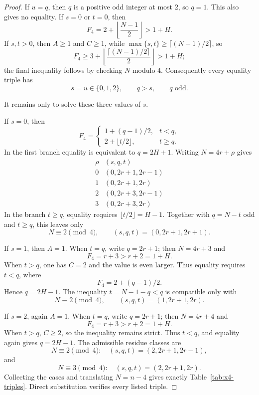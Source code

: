 \documentclass[11pt]{article}
\theoremstyle{definition}
\begin{document}
\begin{proof}
If $u=q$, then $q$ is a positive odd integer at most $2$, so $q=1$. This also gives no equality. If $s=0$ or $t=0$, then
\[
 F_4=2+\left\lfloor\frac{N-1}{2}\right\rfloor>1+H.
\]
If $s,t>0$, then $A\ge1$ and $C\ge1$, while $\max\{s,t\}\ge\lceil(N-1)/2\rceil$, so
\[
 F_4\ge3+\left\lfloor\frac{\lceil(N-1)/2\rceil}{2}\right\rfloor>1+H;
\]
the final inequality follows by checking $N$ modulo $4$. Consequently every equality triple has
\[
 s=u\in\{0,1,2\},\qquad q>s,\qquad q\text{ odd}.
\]

It remains only to solve these three values of $s$.

If $s=0$, then
\[
 F_4=
 \begin{cases}
 1+(q-1)/2,&t<q,\\
 2+\lfloor t/2\rfloor,&t\ge q.
 \end{cases}
\]
In the first branch equality is equivalent to $q=2H+1$. Writing $N=4r+\rho$ gives
\[
\begin{array}{c|c}
\rho&(s,q,t)\\ \hline
0&(0,2r+1,2r-1)\\
1&(0,2r+1,2r)\\
2&(0,2r+3,2r-1)\\
3&(0,2r+3,2r)
\end{array}
\]
In the branch $t\ge q$, equality requires $\lfloor t/2\rfloor=H-1$. Together with $q=N-t$ odd and $t\ge q$, this leaves only
\[
 N\equiv2\pmod4,\qquad (s,q,t)=(0,2r+1,2r+1).
\]

If $s=1$, then $A=1$. When $t=q$, write $q=2r+1$; then $N=4r+3$ and
\[
 F_4=r+3>r+2=1+H.
\]
When $t>q$, one has $C=2$ and the value is even larger. Thus equality requires $t<q$, where
\[
 F_4=2+(q-1)/2.
\]
Hence $q=2H-1$. The inequality $t=N-1-q<q$ is compatible only with
\[
 N\equiv2\pmod4,\qquad (s,q,t)=(1,2r+1,2r).
\]

If $s=2$, again $A=1$. When $t=q$, write $q=2r+1$; then $N=4r+4$ and
\[
 F_4=r+3>r+2=1+H.
\]
When $t>q$, $C\ge2$, so the inequality remains strict. Thus $t<q$, and equality again gives $q=2H-1$. The admissible residue classes are
\[
 N\equiv2\pmod4:\quad (s,q,t)=(2,2r+1,2r-1),
\]
and
\[
 N\equiv3\pmod4:\quad (s,q,t)=(2,2r+1,2r).
\]
Collecting the cases and translating $N=n-4$ gives exactly Table~\ref{tab:x4-triples}. Direct substitution verifies every listed triple.
\end{proof}
\end{document}
